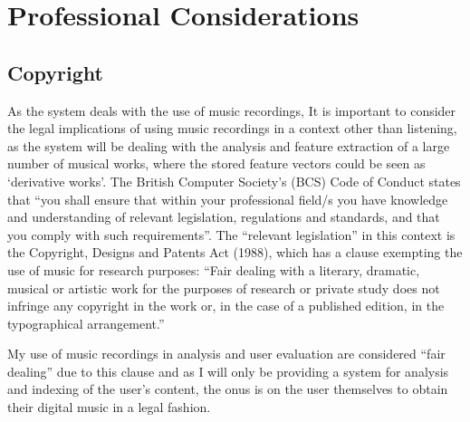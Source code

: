 \section{Professional Considerations}
\label{text:spec:profcons}

\subsection{Copyright}
As the system deals with the use of music recordings, 
It is important to consider the legal implications of using music recordings in a context other than listening, as the system will be dealing with the analysis and feature extraction of a large number of musical works, where the stored feature vectors could be seen as `derivative works'. The British Computer Society's (BCS) Code of Conduct states that ``you shall ensure that within your professional field/s you have knowledge and understanding of relevant legislation, regulations and standards, and that you comply with such requirements''. The ``relevant legislation'' in this context is the Copyright, Designs and Patents Act (1988), which has a clause exempting the use of music for research purposes: ``Fair dealing with a literary, dramatic, musical or artistic work for the purposes of research or private study does not infringe any copyright in the work or, in the case of a published edition, in the typographical arrangement.''

My use of music recordings in analysis and user evaluation are considered ``fair dealing'' due to this clause and as I
will only be providing a system for analysis and indexing of the user's content,
the onus is on the user themselves to obtain their digital music in a legal fashion.

